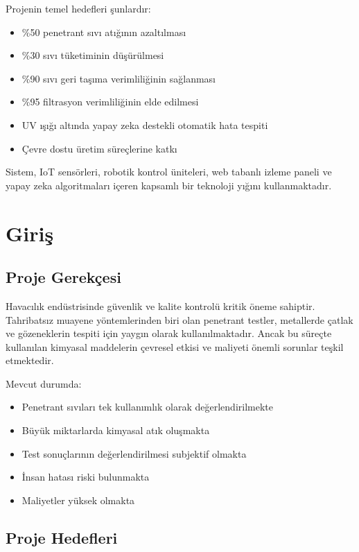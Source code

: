 \documentclass[12pt,a4paper]{article}
\begin{document}
Projenin temel hedefleri şunlardır:
\begin{itemize}
    \item \%50 penetrant sıvı atığının azaltılması
    \item \%30 sıvı tüketiminin düşürülmesi
    \item \%90 sıvı geri taşıma verimliliğinin sağlanması
    \item \%95 filtrasyon verimliliğinin elde edilmesi
    \item UV ışığı altında yapay zeka destekli otomatik hata tespiti
    \item Çevre dostu üretim süreçlerine katkı
\end{itemize}

Sistem, IoT sensörleri, robotik kontrol üniteleri, web tabanlı izleme paneli ve yapay zeka algoritmaları içeren kapsamlı bir teknoloji yığını kullanmaktadır.

\section{Giriş}

\subsection{Proje Gerekçesi}

Havacılık endüstrisinde güvenlik ve kalite kontrolü kritik öneme sahiptir. Tahribatsız muayene yöntemlerinden biri olan penetrant testler, metallerde çatlak ve gözeneklerin tespiti için yaygın olarak kullanılmaktadır. Ancak bu süreçte kullanılan kimyasal maddelerin çevresel etkisi ve maliyeti önemli sorunlar teşkil etmektedir.

Mevcut durumda:
\begin{itemize}
    \item Penetrant sıvıları tek kullanımlık olarak değerlendirilmekte
    \item Büyük miktarlarda kimyasal atık oluşmakta
    \item Test sonuçlarının değerlendirilmesi subjektif olmakta
    \item İnsan hatası riski bulunmakta
    \item Maliyetler yüksek olmakta
\end{itemize}

\subsection{Proje Hedefleri}
\end{document}
